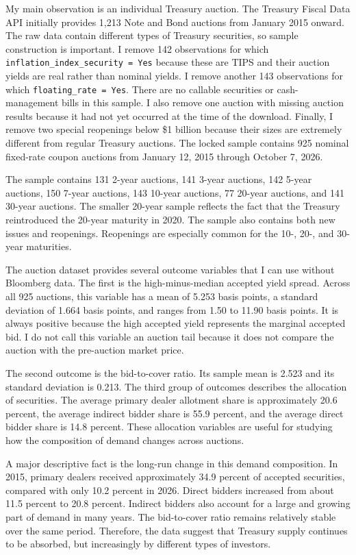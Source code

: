 \documentclass[12pt]{article}
\begin{document}
My main observation is an individual Treasury auction. The Treasury Fiscal Data API initially provides 1,213 Note and Bond auctions from January 2015 onward. The raw data contain different types of Treasury securities, so sample construction is important. I remove 142 observations for which \texttt{inflation\_index\_security = Yes} because these are TIPS and their auction yields are real rather than nominal yields. I remove another 143 observations for which \texttt{floating\_rate = Yes}. There are no callable securities or cash-management bills in this sample. I also remove one auction with missing auction results because it had not yet occurred at the time of the download. Finally, I remove two special reopenings below \$1 billion because their sizes are extremely different from regular Treasury auctions. The locked sample contains 925 nominal fixed-rate coupon auctions from January 12, 2015 through October 7, 2026.

The sample contains 131 2-year auctions, 141 3-year auctions, 142 5-year auctions, 150 7-year auctions, 143 10-year auctions, 77 20-year auctions, and 141 30-year auctions. The smaller 20-year sample reflects the fact that the Treasury reintroduced the 20-year maturity in 2020. The sample also contains both new issues and reopenings. Reopenings are especially common for the 10-, 20-, and 30-year maturities.

The auction dataset provides several outcome variables that I can use without Bloomberg data. The first is the high-minus-median accepted yield spread. Across all 925 auctions, this variable has a mean of 5.253 basis points, a standard deviation of 1.664 basis points, and ranges from 1.50 to 11.90 basis points. It is always positive because the high accepted yield represents the marginal accepted bid. I do not call this variable an auction tail because it does not compare the auction with the pre-auction market price.

The second outcome is the bid-to-cover ratio. Its sample mean is 2.523 and its standard deviation is 0.213. The third group of outcomes describes the allocation of securities. The average primary dealer allotment share is approximately 20.6 percent, the average indirect bidder share is 55.9 percent, and the average direct bidder share is 14.8 percent. These allocation variables are useful for studying how the composition of demand changes across auctions.

A major descriptive fact is the long-run change in this demand composition. In 2015, primary dealers received approximately 34.9 percent of accepted securities, compared with only 10.2 percent in 2026. Direct bidders increased from about 11.5 percent to 20.8 percent. Indirect bidders also account for a large and growing part of demand in many years. The bid-to-cover ratio remains relatively stable over the same period. Therefore, the data suggest that Treasury supply continues to be absorbed, but increasingly by different types of investors.
\end{document}
